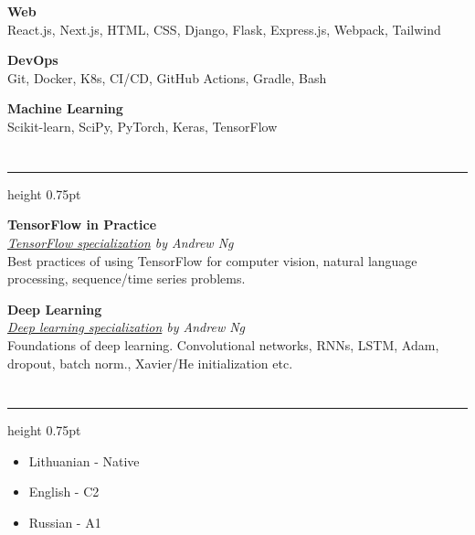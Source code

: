 \documentclass[fontsize=10pt]{article}
\let\oldsection\section
\renewcommand\section[1]{%
	\vspace{-0.5\baselineskip}
    \oldsection{\color{Brown}{#1}}%
	\vspace{-0.5\baselineskip}
    \hrule height 0.75pt
    \vspace{0.75\baselineskip}
}
\begin{document}
\textbf{Web}\\
React.js, Next.js, HTML, CSS, Django, Flask, Express.js, Webpack, Tailwind
\vspace{0.25\baselineskip}

\textbf{DevOps}\\
Git, Docker, K8s, CI/CD, GitHub Actions, Gradle, Bash
\vspace{0.25\baselineskip}

\textbf{Machine Learning}\\
Scikit-learn, SciPy, PyTorch, Keras, TensorFlow


\section{Online Education}
 
 
{\large\textbf{TensorFlow in Practice}}\\
\textit{
	\href{https://www.deeplearning.ai/tensorflow-in-practice/}{TensorFlow specialization} by Andrew Ng
}\\[5pt]
Best practices of using TensorFlow for computer vision, natural language processing,  sequence/time series problems.
\vspace*{0.5\baselineskip}

{\large\textbf{Deep Learning}}\\
\textit{
	\href{https://www.deeplearning.ai/deep-learning-specialization/}{Deep learning specialization} by Andrew Ng
}\\[5pt]
Foundations of deep learning. Convolutional networks, RNNs, LSTM, Adam, dropout, batch norm., Xavier/He initialization etc.

\vspace{4\baselineskip}

\section{Communication skills}

\begin{itemize}
	\item Lithuanian - Native
	\item English - C2
	\item Russian - A1
\end{itemize}
\end{document}
